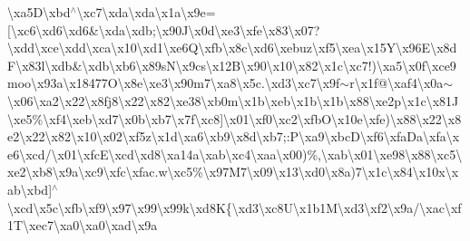 \textbackslash{}xa5\+D\textbackslash{}xbd$^\wedge$\textbackslash{}xc7\textbackslash{}xda\textbackslash{}xda\textbackslash{}x1a\textbackslash{}x9e=\mbox{[}\textbackslash{}xc6\textbackslash{}xd6\textbackslash{}xd6\&\textbackslash{}xda\textbackslash{}xdb;\textbackslash{}x90\+J\textbackslash{}x0d\textbackslash{}xe3\textbackslash{}xfe\textbackslash{}x83\textbackslash{}x07?\textbackslash{}xdd\textbackslash{}xce\textbackslash{}xdd\textbackslash{}xca\textbackslash{}x10\textbackslash{}xd1\textbackslash{}xe6\+Q\textbackslash{}xfb\textbackslash{}x8c\textbackslash{}xd6\textbackslash{}xebuz\textbackslash{}xf5\textbackslash{}xea\textbackslash{}x15\+Y\textbackslash{}x96\+E\textbackslash{}x8d\+F\textbackslash{}x83l\textbackslash{}xdb\&\textbackslash{}xdb\textbackslash{}xb6\textbackslash{}x89s\+N\textbackslash{}x9cs\textbackslash{}x12\+B\textbackslash{}x90\textbackslash{}x10\textbackslash{}x82\textbackslash{}x1c\textbackslash{}xc7!)\textbackslash{}xa5\textbackslash{}x0f\textbackslash{}xce9moo\textbackslash{}x93a\textbackslash{}x18477\+O\textbackslash{}x8e\textbackslash{}xe3\textbackslash{}x90m7\textbackslash{}xa8\textbackslash{}x5c.\textbackslash{}xd3\textbackslash{}xc7\textbackslash{}x9f$\sim$r\textbackslash{}x1f@\textbackslash{}xaf\textquotesingle{}4\textbackslash{}x0a$\sim$\textbackslash{}x06\textbackslash{}xa2\textbackslash{}x22\textbackslash{}x8fj8\textbackslash{}x22\textbackslash{}x82\textbackslash{}xe38\textbackslash{}xb0m\textbackslash{}x1b\textbackslash{}xeb\textbackslash{}x1b\textbackslash{}x1b\textbackslash{}x88\textquotesingle{}\textbackslash{}xe2p\textbackslash{}x1c\textbackslash{}x81\+J\textbackslash{}xe5\%\textbackslash{}xf4\textbackslash{}xeb\textbackslash{}xd7\textbackslash{}x0b\textbackslash{}xb7\textbackslash{}x7f\textbackslash{}xc8\mbox{]}\textbackslash{}x01\textbackslash{}xf0\textbackslash{}xc2\textbackslash{}xfb\+O\textbackslash{}x10e\textbackslash{}xfe)\textbackslash{}x88\textbackslash{}x22\textbackslash{}x8e2\textbackslash{}x22\textbackslash{}x82\textbackslash{}x10\textbackslash{}x02\textbackslash{}xf5z\textbackslash{}x1d\textbackslash{}xa6\textbackslash{}xb9\textbackslash{}x8d\textbackslash{}xb7;\+:\+P\textbackslash{}xa9\textbackslash{}xbc\+D\textbackslash{}xf6\textbackslash{}xfa\+Da\textbackslash{}xfa\textbackslash{}xe6\textbackslash{}xcd/\textbackslash{}x01\textbackslash{}xfc\+E\textbackslash{}xcd\textbackslash{}xd8\textbackslash{}xa14a\textbackslash{}xab\textbackslash{}xc4\textbackslash{}xaa\textbackslash{}x00)\%,\textbackslash{}xab\textbackslash{}x01\textbackslash{}xe98\textbackslash{}x88\textbackslash{}xc5\textbackslash{}xe2\textbackslash{}xb8\textbackslash{}x9a\textbackslash{}xc9\textbackslash{}xfc\textbackslash{}xfac.\+w\textbackslash{}xc5\%\textbackslash{}x97\+M7\textbackslash{}x09\textbackslash{}x13\textbackslash{}xd0\textbackslash{}x8a)7\textbackslash{}x1c\textbackslash{}x84\textbackslash{}x10x\textbackslash{}xab\textbackslash{}xbd\mbox{]}$^\wedge$\textbackslash{}xcd\textbackslash{}x5c\textbackslash{}xfb\textbackslash{}xf9\textbackslash{}x97\textbackslash{}x99\textbackslash{}x99k\textbackslash{}xd8\+K\{\textbackslash{}xd3\textbackslash{}xc8\+U\textbackslash{}x1b1\+M\textbackslash{}xd3\textbackslash{}xf2\textbackslash{}x9a/\textbackslash{}xac\textbackslash{}xf1\+T\textbackslash{}xec7\textbackslash{}xa0\textbackslash{}xa0\textbackslash{}xad\textbackslash{}x9a\